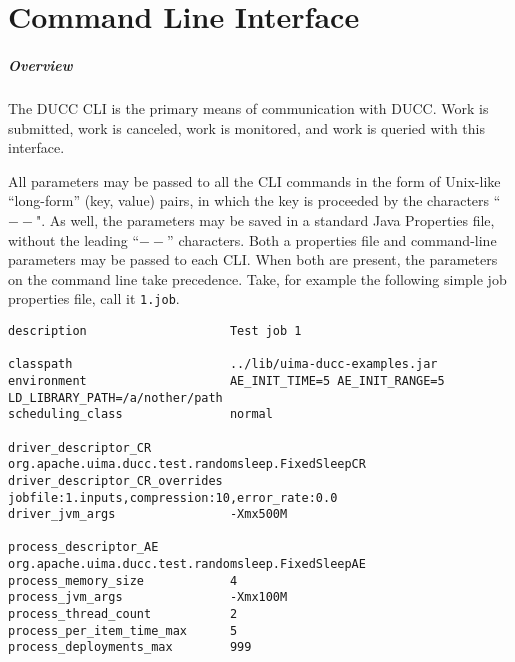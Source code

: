% 
% 
% 
% 
\ifpdf
\else
{}
\fi
\chapter{Command Line Interface}
\label{chap:cli}

    \paragraph{Overview}
    The DUCC CLI is the primary means of communication with DUCC.  Work is submitted, work is
    canceled, work is monitored, and work is queried with this interface.

    All parameters may be passed to all the CLI commands in the form of Unix-like ``long-form''
    (key, value) pairs, in which the key is proceeded by the characters ``$--$".  As well, the
    parameters may be saved in a standard Java Properties file, without the leading ``$--$''
    characters.  Both a properties file and command-line parameters may be passed to each CLI.  When
    both are present, the parameters on the command line take precedence.  Take, for example
    the following simple job properties file, call it {\tt 1.job}.
\begin{verbatim}
description                    Test job 1

classpath                      ../lib/uima-ducc-examples.jar
environment                    AE_INIT_TIME=5 AE_INIT_RANGE=5 LD_LIBRARY_PATH=/a/nother/path
scheduling_class               normal

driver_descriptor_CR           org.apache.uima.ducc.test.randomsleep.FixedSleepCR
driver_descriptor_CR_overrides jobfile:1.inputs,compression:10,error_rate:0.0
driver_jvm_args                -Xmx500M

process_descriptor_AE          org.apache.uima.ducc.test.randomsleep.FixedSleepAE
process_memory_size            4
process_jvm_args               -Xmx100M 
process_thread_count           2
process_per_item_time_max      5
process_deployments_max        999

\end{verbatim}

